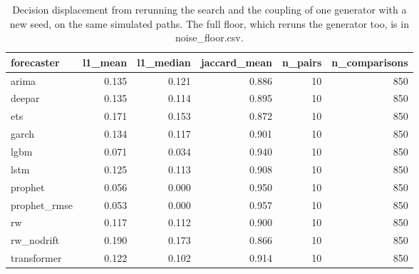\begin{table}
\caption{Decision displacement from rerunning the search and the coupling of one generator with a new seed, on the same simulated paths. The full floor, which reruns the generator too, is in noise_floor.csv.}
\label{tab:displacement_within}
\begin{tabular}{lrrrrr}
\toprule
forecaster & l1\_mean & l1\_median & jaccard\_mean & n\_pairs & n\_comparisons \\
\midrule
arima & 0.135 & 0.121 & 0.886 & 10 & 850 \\
deepar & 0.135 & 0.114 & 0.895 & 10 & 850 \\
ets & 0.171 & 0.153 & 0.872 & 10 & 850 \\
garch & 0.134 & 0.117 & 0.901 & 10 & 850 \\
lgbm & 0.071 & 0.034 & 0.940 & 10 & 850 \\
lstm & 0.125 & 0.113 & 0.908 & 10 & 850 \\
prophet & 0.056 & 0.000 & 0.950 & 10 & 850 \\
prophet\_rmse & 0.053 & 0.000 & 0.957 & 10 & 850 \\
rw & 0.117 & 0.112 & 0.900 & 10 & 850 \\
rw\_nodrift & 0.190 & 0.173 & 0.866 & 10 & 850 \\
transformer & 0.122 & 0.102 & 0.914 & 10 & 850 \\
\bottomrule
\end{tabular}
\end{table}
